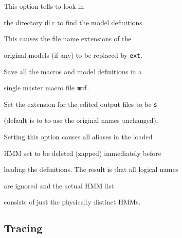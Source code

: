 \begin{optlist}





   This option tells  to look in


      the directory \texttt{dir} to find the model definitions.





    This causes the file name extensions of the


      original models (if any) to be replaced by \texttt{ext}.





   Save all the macros and model definitions in a


        single master macro file \texttt{mmf}.





   Set the extension for the edited output files to be \texttt{s} 


      (default is to to use the original names unchanged).





   Setting this option causes all aliases in the loaded


      HMM set to be deleted (zapped) immediately before 


      loading the definitions.  The result is that all logical names


      are ignored and the actual HMM list


      consists of just the physically distinct HMMs.


\stdoptB


\stdoptH


\stdoptM


\stdoptQ





\end{optlist}







\subsection{Tracing}





